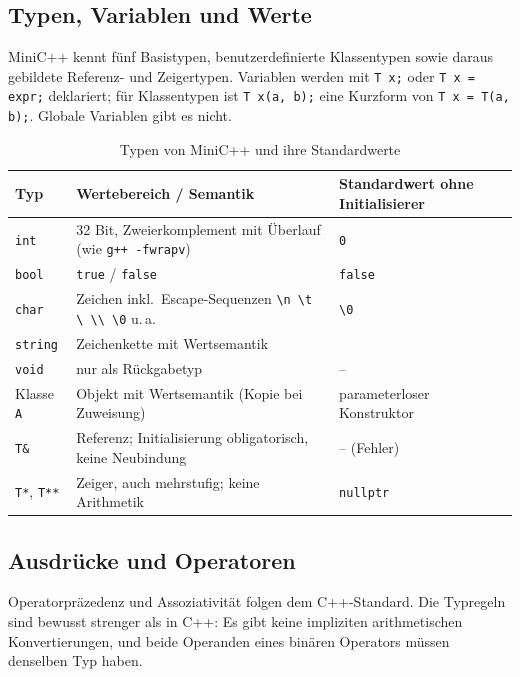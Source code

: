 \documentclass[11pt,a4paper,parskip=half,headsepline,toc=flat]{scrartcl}
\newcommand{\code}[1]{\texttt{#1}}
\newcommand{\bs}{\textbackslash}
\newcommand{\dquote}{\textquotedbl}
\newcommand{\sq}{\textquotesingle}
\newcommand{\thead}{\rowcolor{headbg}}
\newcommand{\hcell}[1]{\textbf{\color{navy}#1}}
\newenvironment{reporttable}[1][]%
  {\begin{table}[htbp]\centering\small\renewcommand{\arraystretch}{1.25}\rowcolors{2}{white}{zebra}}%
  {\end{table}}
\begin{document}
\subsection{Typen, Variablen und Werte}
MiniC++ kennt fünf Basistypen, benutzerdefinierte Klassentypen sowie daraus gebildete Referenz- und Zeigertypen.
Variablen werden mit \code{T x;} oder \code{T x = expr;} deklariert; für Klassentypen ist \code{T x(a, b);} eine
Kurzform von \code{T x = T(a, b);}. Globale Variablen gibt es nicht.

\begin{reporttable}
\begin{tabular}{L{0.13}L{0.5}L{0.29}}
\thead \hcell{Typ} & \hcell{Wertebereich / Semantik} & \hcell{Standardwert ohne Initialisierer} \\ \midrule
\code{int} & 32 Bit, Zweierkomplement mit Überlauf (wie \code{g++ -fwrapv}) & \code{0} \\
\code{bool} & \code{true} / \code{false} & \code{false} \\
\code{char} & Zeichen inkl.\ Escape-Sequenzen \code{\bs n \bs t \bs\sq{} \bs\bs{} \bs 0} u.\,a. & \code{\sq\bs 0\sq} \\
\code{string} & Zeichenkette mit Wertsemantik & \code{\dquote\dquote} \\
\code{void} & nur als Rückgabetyp & -- \\
Klasse \code{A} & Objekt mit Wertsemantik (Kopie bei Zuweisung) & parameterloser Konstruktor \\
\code{T\&} & Referenz; Initialisierung obligatorisch, keine Neubindung & -- (Fehler) \\
\code{T*}, \code{T**} & Zeiger, auch mehrstufig; keine Arithmetik & \code{nullptr} \\ \bottomrule
\end{tabular}
\caption{Typen von MiniC++ und ihre Standardwerte}
\end{reporttable}

\subsection{Ausdrücke und Operatoren}
Operatorpräzedenz und Assoziativität folgen dem C++-Standard. Die Typregeln sind bewusst strenger als in C++: Es gibt
keine impliziten arithmetischen Konvertierungen, und beide Operanden eines binären Operators müssen denselben Typ
haben.
\end{document}
